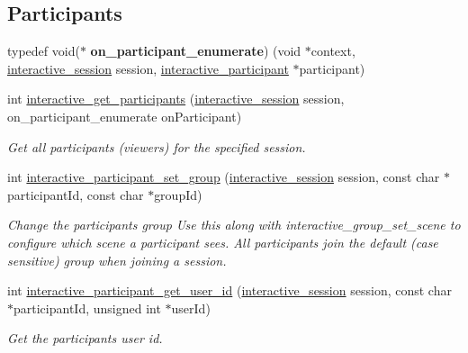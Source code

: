 \subsection*{Participants}
\begin{DoxyCompactItemize}
\item 
\mbox{\label{group___interactivity_ga2e787174c408554c848de858f8e4d319}} 
typedef void($\ast$ {\bfseries on\+\_\+participant\+\_\+enumerate}) (void $\ast$context, \mbox{\hyperlink{group___interactivity_ga6d8819d38b8dc8994a2299cf22a65a31}{interactive\+\_\+session}} session, \mbox{\hyperlink{structinteractive__participant}{interactive\+\_\+participant}} $\ast$participant)
\item 
int \mbox{\hyperlink{group___interactivity_ga51aa5a660a864a3d574e17806c51ac50}{interactive\+\_\+get\+\_\+participants}} (\mbox{\hyperlink{group___interactivity_ga6d8819d38b8dc8994a2299cf22a65a31}{interactive\+\_\+session}} session, on\+\_\+participant\+\_\+enumerate on\+Participant)
\begin{DoxyCompactList}\small\item\em Get all participants (viewers) for the specified session. \end{DoxyCompactList}\item 
int \mbox{\hyperlink{group___interactivity_ga5d75a20e499ba477345516d3f3de7dc7}{interactive\+\_\+participant\+\_\+set\+\_\+group}} (\mbox{\hyperlink{group___interactivity_ga6d8819d38b8dc8994a2299cf22a65a31}{interactive\+\_\+session}} session, const char $\ast$participant\+Id, const char $\ast$group\+Id)
\begin{DoxyCompactList}\small\item\em Change the participant\textquotesingle{}s group Use this along with {\ttfamily interactive\+\_\+group\+\_\+set\+\_\+scene} to configure which scene a participant sees. All participants join the \textquotesingle{}default\textquotesingle{} (case sensitive) group when joining a session. \end{DoxyCompactList}\item 
int \mbox{\hyperlink{group___interactivity_ga2bb765e59c4b1a4c4188cff212bb0cff}{interactive\+\_\+participant\+\_\+get\+\_\+user\+\_\+id}} (\mbox{\hyperlink{group___interactivity_ga6d8819d38b8dc8994a2299cf22a65a31}{interactive\+\_\+session}} session, const char $\ast$participant\+Id, unsigned int $\ast$user\+Id)
\begin{DoxyCompactList}\small\item\em Get the participant\textquotesingle{}s user id. \end{DoxyCompactList}\item 

\end{DoxyCompactItemize}
